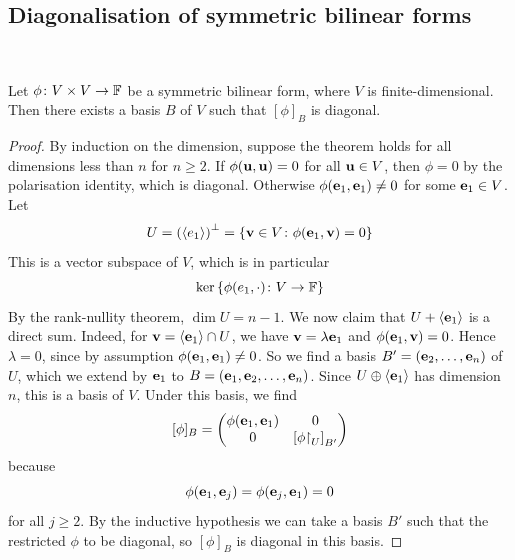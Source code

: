 \documentclass[a4paper]{article}
\begin{document}
\subsection{Diagonalisation of symmetric bilinear forms}
\ \vspace*{-1.5em}
\begin{theorem}
	Let \( \phi \colon V \times V \to {\mathbb{F}} \) be a symmetric bilinear form, where \( V \) is finite-dimensional.
	Then there exists a basis \( B \) of \( V \) such that \( [\phi]_B \) is diagonal.
\end{theorem}
\begin{proof}
	By induction on the dimension, suppose the theorem holds for all dimensions less than \( n \) for \( n \geq 2 \).
	If \( \phi({\bf u},{\bf u}) = 0 \) for all \( {\bf u} \in V \), then \( \phi = 0 \) by the polarisation identity, which is diagonal.
	Otherwise \( \phi({\bf e}_1, {\bf e}_1) \neq 0 \) for some \( {\bf e}_1 \in V \).
	Let
	\[
		U = \qty(\left\langle{} e_1 \right\rangle)^\perp = \qty{{\bf v}\in V \colon \phi({\bf e}_1, {\bf v}) = 0}
	\]
	This is a vector subspace of \( V \), which is in particular
	\[
		\ker \qty{ \phi(e_1, \cdot) \colon V \to {\mathbb{F}}}
	\]
	By the rank-nullity theorem, \( \dim U = n - 1 \).
	We now claim that \( U + \left\langle{} {\bf e}_1 \right\rangle \) is a direct sum.
	Indeed, for \( {\bf v} = \left\langle{} {\bf e}_1 \right\rangle \cap U \), we have \( {\bf v} = \lambda {\bf e}_1 \) and \( \phi({\bf e}_1, {\bf v}) = 0 \).
	Hence \( \lambda = 0 \), since by assumption \( \phi({\bf e}_1, {\bf e}_1) \neq 0 \).
	So we find a basis \( B' = ({\bf e}_2, \dots, {\bf e}_n) \) of \( U \), which we extend by \( {\bf e}_1 \) to \( B = ({\bf e}_1, {\bf e}_2, \dots, {\bf e}_n) \).
	Since \( U \oplus \left\langle{} {\bf e}_1 \right\rangle \) has dimension \( n \), this is a basis of \( V \).
	Under this basis, we find
	\[
		[\phi]_B = \begin{pmatrix}
			\phi({\bf e}_1, {\bf e}_1) & 0                          \\
			0              & \qty[{\phi}\mathord{\upharpoonright}_{U}]_{B'}
		\end{pmatrix}
	\]
	because
	\[
		\phi({\bf e}_1, {\bf e}_j) = \phi({\bf e}_j, {\bf e}_1) = 0
	\]
	for all \( j \geq 2 \).
	By the inductive hypothesis we can take a basis \( B' \) such that the restricted \( \phi \) to be diagonal, so \( [\phi]_B \) is diagonal in this basis.
\end{proof}
\end{document}

